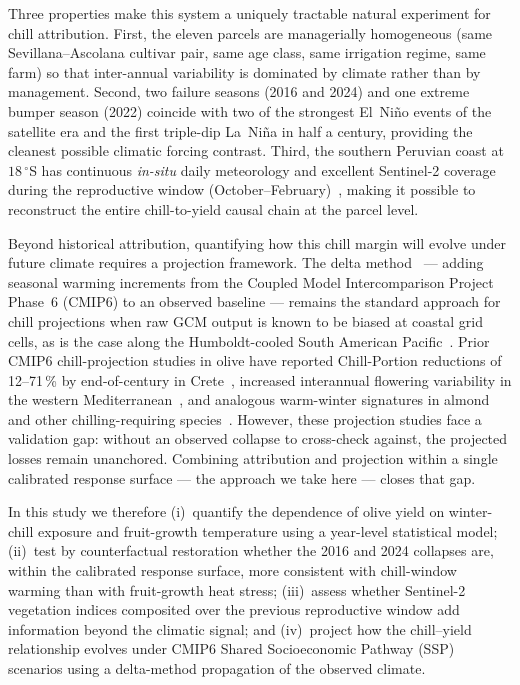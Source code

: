 \documentclass[agronomy,article,submit,pdftex,moreauthors]{Definitions/mdpi}
\begin{document}
Three properties make this system a uniquely tractable natural experiment for chill attribution. First, the eleven parcels are managerially homogeneous (same Sevillana--Ascolana cultivar pair, same age class, same irrigation regime, same farm) so that inter-annual variability is dominated by climate rather than by management. Second, two failure seasons (2016 and 2024) and one extreme bumper season (2022) coincide with two of the strongest El~Ni\~{n}o events of the satellite era and the first triple-dip La~Ni\~{n}a in half a century, providing the cleanest possible climatic forcing contrast. Third, the southern Peruvian coast at $18\,^\circ$S has continuous \emph{in-situ} daily meteorology and excellent Sentinel-2 coverage during the reproductive window (October--February)~\cite{drusch2012,wu2023rs}, making it possible to reconstruct the entire chill-to-yield causal chain at the parcel level.

Beyond historical attribution, quantifying how this chill margin will evolve under future climate requires a projection framework. The delta method~\cite{luedeling2012,hannah2013} --- adding seasonal warming increments from the Coupled Model Intercomparison Project Phase~6 (CMIP6) to an observed baseline --- remains the standard approach for chill projections when raw GCM output is known to be biased at coastal grid cells, as is the case along the Humboldt-cooled South American Pacific~\cite{thrasher2022}. Prior CMIP6 chill-projection studies in olive have reported Chill-Portion reductions of 12--71\,\% by end-of-century in Crete~\cite{grillakis2022olive}, increased interannual flowering variability in the western Mediterranean~\cite{picornell2023olive}, and analogous warm-winter signatures in almond and other chilling-requiring species~\cite{benmoussa2017,fernandez2021warmwinters,jagermeyr2021}. However, these projection studies face a validation gap: without an observed collapse to cross-check against, the projected losses remain unanchored. Combining attribution and projection within a single calibrated response surface --- the approach we take here --- closes that gap.

In this study we therefore (i)~quantify the dependence of olive yield on winter-chill exposure and fruit-growth temperature using a year-level statistical model; (ii)~test by counterfactual restoration whether the 2016 and 2024 collapses are, within the calibrated response surface, more consistent with chill-window warming than with fruit-growth heat stress; (iii)~assess whether Sentinel-2 vegetation indices composited over the previous reproductive window add information beyond the climatic signal; and (iv)~project how the chill--yield relationship evolves under CMIP6 Shared Socioeconomic Pathway (SSP) scenarios using a delta-method propagation of the observed climate.
\end{document}
